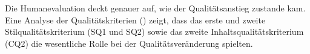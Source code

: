 \begin{figure}
\captionsetup{width=.45\textwidth}
\begin{floatrow}
\end{floatrow}
\end{figure}

Die Humanevaluation deckt genauer auf, wie der Qualitätsanstieg zustande kam. Eine Analyse der Qualitätskriterien () zeigt, dass das erste und zweite Stilqualitätskriterium (SQ1 und SQ2) sowie das zweite Inhaltsqualitätskriterium (CQ2) die wesentliche Rolle bei der Qualitätsveränderung spielten.


